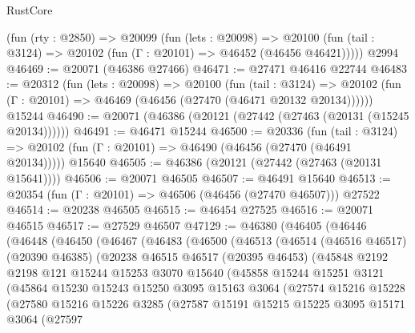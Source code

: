 \begin{lexlean}{RustCore}
\begin{coremodule}
    (fun (rty : @2850) =>
    @20099
      (fun (lets : @20098) =>
      @20100 (fun (tail : @3124) => @20102 (fun (Γ : @20101) => @46452 (@46456 @46421)))))
    @2994
@46469 := @20071 (@46386 @27466)
@46471 := @27471 @46416 @22744
@46483 := @20312
    (fun (lets : @20098) =>
    @20100
      (fun (tail : @3124) =>
      @20102 (fun (Γ : @20101) => @46469 (@46456 (@27470 (@46471 @20132 @20134))))))
    @15244
@46490 := @20071 (@46386 (@20121 (@27442 (@27463 (@20131 (@15245 @20134))))))
@46491 := @46471 @15244
@46500 := @20336
    (fun (tail : @3124) => @20102 (fun (Γ : @20101) => @46490 (@46456 (@27470 (@46491 @20134)))))
    @15640
@46505 := @46386 (@20121 (@27442 (@27463 (@20131 @15641))))
@46506 := @20071 @46505
@46507 := @46491 @15640
@46513 := @20354 (fun (Γ : @20101) => @46506 (@46456 (@27470 @46507))) @27522
@46514 := @20238 @46505
@46515 := @46454 @27525
@46516 := @20071 @46515
@46517 := @27529 @46507
@47129 := @46380
    (@46405
      (@46446
        (@46448
          (@46450
            (@46467
              (@46483
                (@46500
                  (@46513
                    (@46514
                      (@46516 @46517)
                      (@20390 @46385)
                      (@20238
                        @46515
                        @46517
                        (@20395 @46453)
                        (@45848
                          @2192
                          @2198
                          @121
                          @15244
                          @15253
                          @3070
                          @15640
                          (@45858
                            @15244
                            @15251
                            @3121
                            (@45864
                              @15230
                              @15243
                              @15250
                              @3095
                              @15163
                              @3064
                              (@27574
                                @15216
                                @15228
                                (@27580
                                  @15216
                                  @15226
                                  @3285
                                  (@27587
                                    @15191
                                    @15215
                                    @15225
                                    @3095
                                    @15171
                                    @3064
                                    (@27597

\end{coremodule}
\end{lexlean}
